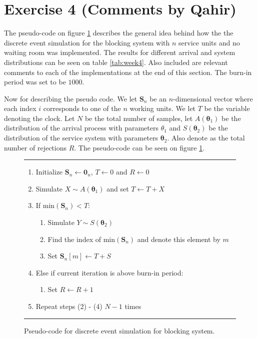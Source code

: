 \newpage
\section*{Exercise 4 (Comments by Qahir)}
The pseudo-code on figure \ref{fig:figw4} describes the general idea behind how the the discrete event simulation for the blocking system with $n$ service units and no waiting room was implemented. The results for different arrival and system distributions can be seen on table \ref{tab:week4}. Also included are relevant comments to each of the implementations at the end of this section. The burn-in period was set to be $1000$. 

Now for describing the pseudo code. We let $\bm{S}_n$ be an $n$-dimensional vector where each index $i$ corresponds to one of the $n$ working units. We let $T$ be the variable denoting the clock. Let $N$ be the total number of samples, let $A(\bm{\theta}_1)$ be the distribution of the arrival process with parameters $\theta_1$ and $S(\bm{\theta}_2)$ be the distribution of the service system with parameters $\bm{\theta}_2$. Also denote as the total number of rejections $R$. The pseudo-code can be seen on figure \ref{fig:figw4}. 


\begin{figure}[H]
    \hrule
    \vspace*{0.2cm}
    \begin{enumerate}
    \item Initialize $\bm{S}_n \leftarrow \bm{0}_n$, $T \leftarrow 0$ and $R \leftarrow 0$ 
    \item Simulate $X \sim A(\bm{\theta}_1)$ and set $T \leftarrow  T + X$
    \item If $\text{min}(\boldsymbol{S}_n) < T$:
    \begin{enumerate}
        \item Simulate $Y \sim S(\bm{\theta}_2)$
        \item Find the index of $\text{min}(\boldsymbol{S}_n)$ and denote this element by $m$
        \item Set $\bm{S}_n[m] \leftarrow T + S$ 
    \end{enumerate}
    \item Else if current iteration is above burn-in period:
    \begin{enumerate}
        \item Set $R \leftarrow R + 1$
    \end{enumerate}
    \item Repeat steps (2) - (4) $N-1$ times 
    \end{enumerate}
    \vspace*{0.2cm}
    \hrule
    \vspace*{0.2cm}
    \caption{Pseudo-code for discrete event simulation for blocking system.}
    \label{fig:figw4}
\end{figure}






